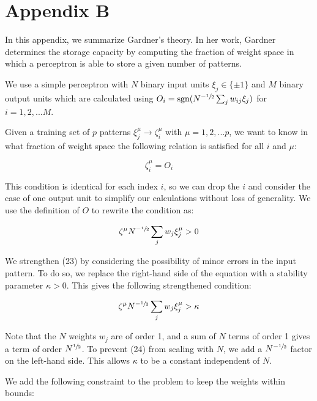\section*{Appendix B}


In this appendix, we summarize Gardner's theory. In her work, Gardner determines the storage capacity by computing the fraction of weight space in which a perceptron is able to store a given number of patterns. 

We use a simple perceptron with $N$ binary input units $\xi_j \in \{ \pm 1 \}$ and $M$ binary output units which are calculated using $O_i = \mathrm{sgn} (N^{-\sfrac{1}{2}} \sum_j w_{ij} \xi_j)$ for $i = 1, 2, ... M$. 

Given a training set of $p$ patterns $\xi_j^\mu \longrightarrow \zeta_i^\mu$ with $\mu = 1, 2, ... p$, we want to know in what fraction of weight space the following relation is satisfied for all $i$ and $\mu$:

\begin{equation}
    \zeta_i^\mu = O_i
\end{equation}

This condition is identical for each index $i$, so we can drop the $i$ and consider the case of one output unit to simplify our calculations without loss of generality. We use the definition of $O$ to rewrite the condition as:

\begin{equation}
    \zeta^\mu N^{-\sfrac{1}{2}} \sum_j w_{j} \xi_j^\mu > 0
\end{equation}

We strengthen (23) by considering the possibility of minor errors in the input pattern. To do so, we replace the right-hand side of the equation with a stability parameter $\kappa > 0$. This gives the following strengthened condition:

\begin{equation}
    \zeta^\mu N^{-\sfrac{1}{2}}\sum_j w_{j} \xi_j^\mu > \kappa
\end{equation}

Note that the $N$ weights $w_j$ are of order 1, and a sum of $N$ terms of order 1 gives a term of order $N^{\sfrac{1}{2}}$. To prevent (24) from scaling with $N$, we add a $N^{-\sfrac{1}{2}}$ factor on the left-hand side. This allows $\kappa$ to be a constant independent of $N$.

We add the following constraint to the problem to keep the weights within bounds:

